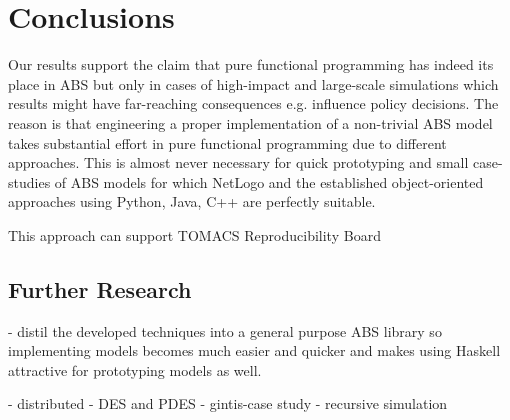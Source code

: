 \section{Conclusions}
\label{sec:conclusions}

Our results support the claim that pure functional programming has indeed its place in ABS but only in cases of high-impact and large-scale simulations which results might have far-reaching consequences e.g. influence policy decisions. The reason is that engineering a proper implementation of a non-trivial ABS model takes substantial effort in pure functional programming due to different approaches. This is almost never necessary for quick prototyping and small case-studies of ABS models for which NetLogo and the established object-oriented approaches using Python, Java, C++ are perfectly suitable.

This approach can support TOMACS Reproducibility Board

\subsection{Further Research}
- distil the developed techniques into a general purpose ABS library so implementing models becomes much easier and quicker and makes using Haskell attractive for prototyping models as well.

- distributed
- DES and PDES
- gintis-case study
- recursive simulation